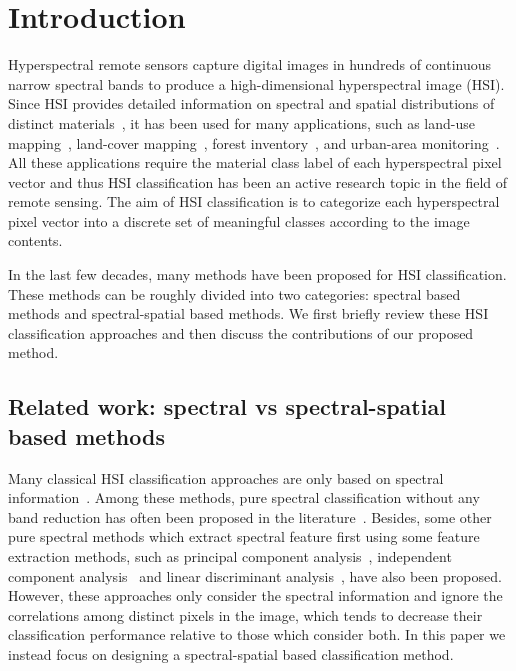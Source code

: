 \documentclass[journal]{IEEEtran}
\begin{document}
	\IEEEpeerreviewmaketitle
	\section{Introduction}
	Hyperspectral remote sensors capture digital images in hundreds of continuous narrow spectral bands to produce a high-dimensional hyperspectral image (HSI). Since HSI provides detailed information on spectral and spatial distributions of distinct materials{{~\cite{plaza2009recent}}}, it has been used for many applications, such as land-use mapping{{~\cite{camps2005kernel,petropoulos2012support,kitada2012land}}}, land-cover mapping{{~\cite{kitada2012land}}}, forest inventory{{~\cite{matsuki2015hyperspectral}}}, and urban-area monitoring{{~\cite{shafri2012hyperspectral}.}} All these applications require the material class label of each hyperspectral pixel vector and thus HSI classification has been an active research topic in the field of remote sensing. The aim of HSI classification is to categorize each hyperspectral pixel vector into a discrete set of meaningful classes according to the image contents.
	
	In the last few decades, many methods have been proposed for HSI classification. These methods can be roughly divided into two categories: spectral based methods and spectral-spatial based methods. We first briefly review these {{HSI classification approaches}} and then discuss the contributions of our proposed method.
	
	\subsection{Related work: spectral vs spectral-spatial based methods}
	Many classical HSI classification approaches are only based on spectral information~\cite{licciardi2012linear,villa2011hyperspectral,bandos2009classification}. {{Among}} these methods, {{pure spectral classification without any band reduction has often been proposed in the literature~\cite{civco1993artificial,bischof1998finding,melgani2004classification,camps2004robust}. Besides, some other pure spectral methods which extract spectral feature first using some feature extraction methods, such as principal component analysis~\cite{licciardi2012linear}, independent component analysis~\cite{villa2011hyperspectral} and linear discriminant analysis~\cite{bandos2009classification}, have also been proposed.}} {{However}}, these approaches only consider the spectral information and ignore the correlations among distinct pixels in the image, which tends to decrease their classification performance relative to those which consider both. In this paper we instead focus on designing a 
spectral-spatial based classification method.
	
\end{document}
